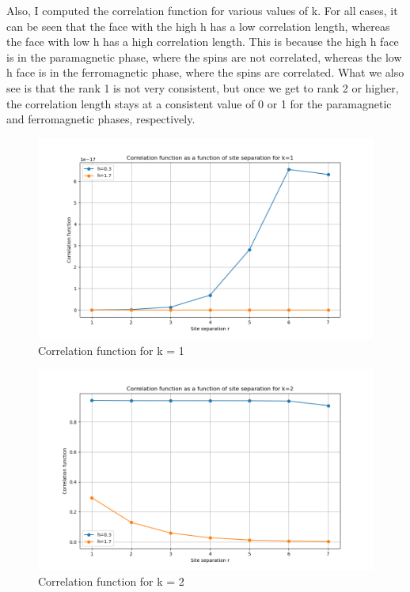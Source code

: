 \documentclass[12pt]{article}
\begin{document}
\newpage
Also, I computed the correlation function for various values of k. For all cases, it can be seen that the face with the high h has a low correlation length, whereas the face with low h has a high correlation length. This is because the high h face is in the paramagnetic phase, where the spins are not correlated, whereas the low h face is in the ferromagnetic phase, where the spins are correlated. What we also see is that the rank 1 is not very consistent, but once we get to rank 2 or higher, the correlation length stays at a consistent value of 0 or 1 for the paramagnetic and ferromagnetic phases, respectively.
\begin{figure}
    \centering
    \includegraphics[width=\textwidth]{5-5_correlation_k1.png}
    \caption{Correlation function for k = 1}
\end{figure}
\begin{figure}
    \centering
    \includegraphics[width=\textwidth]{5-5_correlation_k2.png}
    \caption{Correlation function for k = 2}
\end{figure}
\end{document}

